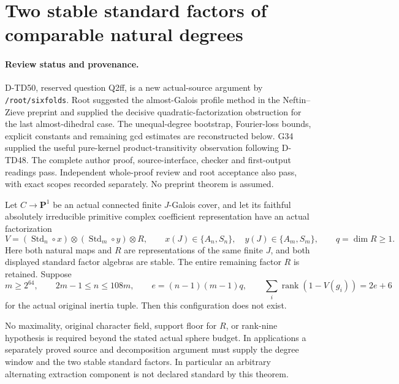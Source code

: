 \section{Two stable standard factors of comparable natural degrees}
\label{sec:two-standard-product-genus}

\paragraph{Review status and provenance.}
D-TD50, reserved question Q2ff, is a new actual-source argument by
\texttt{/root/sixfolds}.  Root suggested the almost-Galois profile
method in the Neftin--Zieve preprint and supplied the decisive
quadratic-factorization obstruction for the last almost-dihedral
case.  The unequal-degree bootstrap, Fourier-loss bounds, explicit
constants and remaining gcd estimates are reconstructed below.
G34 supplied the useful pure-kernel product-transitivity observation
following D-TD48.  The complete author proof, source-interface,
checker and first-output readings pass.  Independent whole-proof
review and root acceptance also pass, with exact scopes recorded
separately.  No preprint theorem is assumed.

\begin{theorem}[D-TD50]
Let \(C\to\mathbf P^1\) be an actual connected finite
\(J\)-Galois cover, and let its faithful absolutely irreducible
primitive complex coefficient representation have an actual
factorization
\[
 V=(\operatorname{Std}_n\circ x)\otimes
       (\operatorname{Std}_m\circ y)\otimes R,
 \qquad x(J)\in\{A_n,S_n\},\quad y(J)\in\{A_m,S_m\},
 \qquad q=\dim R\ge1.
 \tag{TPG.1}
\]
Here both natural maps and \(R\) are representations of the same
finite \(J\), and both displayed standard factor algebras are stable.
The entire remaining factor \(R\) is retained.  Suppose
\[
 m\ge2^{64},\qquad 2m-1\le n\le108m,
 \qquad e=(n-1)(m-1)q,
 \qquad \sum_i\operatorname{rank}(1-V(g_i))=2e+6
 \tag{TPG.2}
\]
for the actual original inertia tuple.  Then this configuration
does not exist.

No maximality, original character field, support floor for \(R\),
or rank-nine hypothesis is required beyond the stated actual sphere
budget.  In applications a separately proved source and decomposition
argument must supply the degree window and the two stable standard
factors.  In particular an arbitrary alternating extraction component
is not declared standard by this theorem.
\end{theorem}

